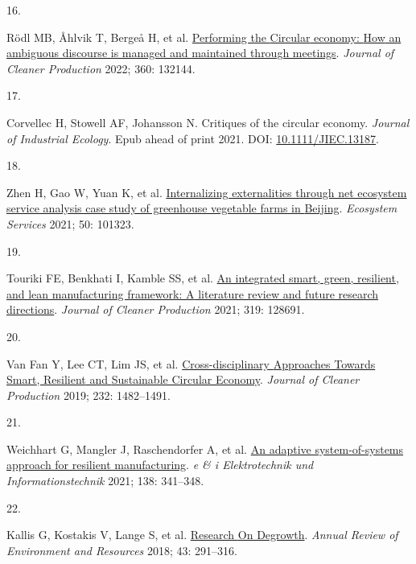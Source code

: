 \documentclass[
  11pt,
  a4paperpaper,
  onecolumn]{article}
\newlength{\cslhangindent}
\newlength{\csllabelwidth}
\newlength{\cslentryspacingunit} %
\newenvironment{CSLReferences}[2] %
 {%
  \setlength{\parindent}{0pt}
  \ifodd #1
  \let\oldpar\par
  \def\par{\hangindent=\cslhangindent\oldpar}
  \fi
  \setlength{\parskip}{#2\cslentryspacingunit}
 }%
 {}
\newcommand{\CSLLeftMargin}[1]{\parbox[t]{\csllabelwidth}{#1}}
\newcommand{\CSLRightInline}[1]{\parbox[t]{\linewidth - \csllabelwidth}{#1}\break}
\begin{document}
\begin{CSLReferences}{0}{0}
\leavevmode{}%
\CSLLeftMargin{16. }%
\CSLRightInline{Rödl MB, Åhlvik T, Bergeå H, et al.
\href{https://doi.org/10.1016/J.JCLEPRO.2022.132144}{Performing the
{Circular} economy: {How} an ambiguous discourse is managed and
maintained through meetings}. \emph{Journal of Cleaner Production} 2022;
360: 132144.}

\leavevmode{}%
\CSLLeftMargin{17. }%
\CSLRightInline{Corvellec H, Stowell AF, Johansson N. Critiques of the
circular economy. \emph{Journal of Industrial Ecology}. Epub ahead of
print 2021. DOI:
\href{https://doi.org/10.1111/JIEC.13187}{10.1111/JIEC.13187}.}

\leavevmode{}%
\CSLLeftMargin{18. }%
\CSLRightInline{Zhen H, Gao W, Yuan K, et al.
\href{https://doi.org/10.1016/j.ecoser.2021.101323}{Internalizing
externalities through net ecosystem service analysis\textendash{{A}}
case study of greenhouse vegetable farms in {Beijing}}. \emph{Ecosystem
Services} 2021; 50: 101323.}

\leavevmode{}%
\CSLLeftMargin{19. }%
\CSLRightInline{Touriki FE, Benkhati I, Kamble SS, et al.
\href{https://doi.org/10.1016/J.JCLEPRO.2021.128691}{An integrated
smart, green, resilient, and lean manufacturing framework: {A}
literature review and future research directions}. \emph{Journal of
Cleaner Production} 2021; 319: 128691.}

\leavevmode{}%
\CSLLeftMargin{20. }%
\CSLRightInline{Van Fan Y, Lee CT, Lim JS, et al.
\href{https://doi.org/10.1016/j.jclepro.2019.05.266}{Cross-disciplinary
{Approaches Towards Smart}, {Resilient} and {Sustainable Circular
Economy}}. \emph{Journal of Cleaner Production} 2019; 232: 1482--1491.}

\leavevmode{}%
\CSLLeftMargin{21. }%
\CSLRightInline{Weichhart G, Mangler J, Raschendorfer A, et al.
\href{https://doi.org/10.1007/s00502-021-00912-2}{An adaptive
system-of-systems approach for resilient manufacturing}. \emph{e \& i
Elektrotechnik und Informationstechnik} 2021; 138: 341--348.}

\leavevmode{}%
\CSLLeftMargin{22. }%
\CSLRightInline{Kallis G, Kostakis V, Lange S, et al.
\href{https://doi.org/10.1146/annurev-environ-102017-025941}{Research
{On Degrowth}}. \emph{Annual Review of Environment and Resources} 2018;
43: 291--316.}


\end{CSLReferences}
\end{document}
